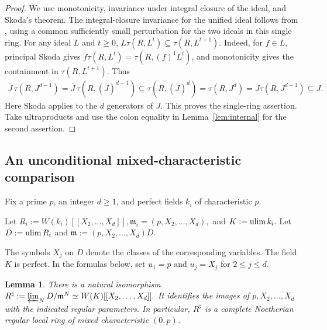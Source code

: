 \documentclass[11pt,a4paper]{amsart}
\numberwithin{equation}{section}
\newtheorem{lemma}[theorem]{Lemma}
\newcommand{\mm}{\mathfrak m}
\newcommand{\cl}[1]{\overline{#1}}
\begin{document}
 \begin{proof}
 	We use monotonicity, invariance under integral closure of the
 	ideal, and Skoda's theorem. The integral-closure invariance for
 	the unified ideal follows from
 	\cite[Proposition 8.6(c), Theorem 8.11, and Definition 8.13]{BMP},
 	using a common sufficiently small perturbation for the two
 	ideals in this single ring.
 	For any ideal $L$ and $t\geq0$,
$	L\tau(R,L^t)\subseteq\tau(R,L^{t+1}). $
 	Indeed, for $f\in L$, principal Skoda gives
 	$f\tau(R,L^t)=\tau(R,(f)^1L^t)$, and monotonicity gives the
 	containment in $\tau(R,L^{t+1})$. Thus
 	\begin{align*}
 		\cl J\,\tau(R,J^{d-1})
 	=\cl J\,\tau(R,(\cl J)^{d-1})
 	\subseteq\tau(R,(\cl J)^d)
 		=\tau(R,J^d)
 		=J\tau(R,J^{d-1})\subseteq J.
 	\end{align*}
 	Here Skoda applies to the $d$ generators of $J$. This proves the
 	single-ring assertion. Take ultraproducts and use the colon
 	equality in Lemma~\ref{lem:internal} for the second assertion.
 \end{proof}
 
 
 
 \subsection{An unconditional mixed-characteristic comparison}
 \label{sec:comparison}
 
 Fix a prime $p$, an integer $d\geq1$, and perfect fields $k_i$
 of characteristic $p$.  
 \begin{notation}
 Let $R_i:=W(k_i)[[X_2,\ldots,X_d]],
 \mm_i=(p,X_2,\ldots,X_d),$ and 
 $K:=\operatorname*{ulim} k_i.$
Let $D:=\operatorname*{ulim} R_i$ and $\mm:=(p,X_2,\ldots,X_d)D$.
 \end{notation}
 The symbols $X_j$ on $D$ denote the classes of the corresponding
 variables. The field $K$ is perfect. In the formulas below, set
 $u_1=p$ and $u_j=X_j$ for $2\leq j\leq d$.
 
 \begin{lemma}\label{lem:witt}
 	There is a natural isomorphism
 $R^\sharp:=\varprojlim_N D/\mm^N
 	\simeq W(K)[[X_2,\ldots,X_d]].$
 	It identifies the images of $p,X_2,\ldots,X_d$ with the indicated
 	regular parameters. In particular, $R^\sharp$ is a complete
 	Noetherian regular local ring of mixed characteristic $(0,p)$.
 \end{lemma}
 
\end{document}

